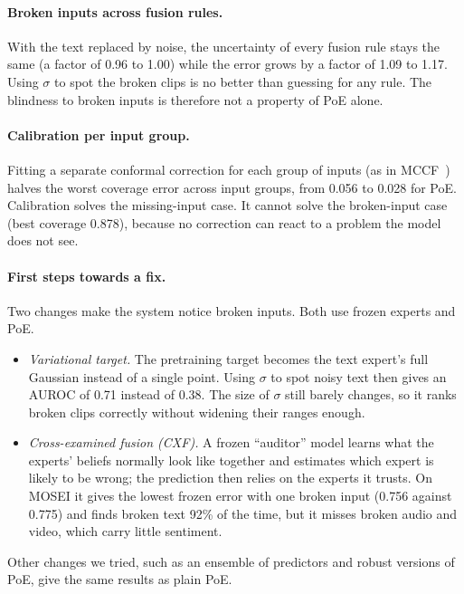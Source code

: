 \documentclass[10pt,twocolumn]{article}
\begin{document}
\paragraph{Broken inputs across fusion rules.} With the text replaced by noise, the uncertainty of every fusion rule
stays the same (a factor of 0.96 to 1.00) while the error grows by a factor of 1.09 to 1.17. Using $\sigma$ to spot the
broken clips is no better than guessing for any rule. The blindness to broken inputs is therefore not a property of PoE
alone.

\paragraph{Calibration per input group.} Fitting a separate conformal correction for each group of inputs (as in
MCCF~\cite{mccf2026}) halves the worst coverage error across input groups, from 0.056 to 0.028 for PoE. Calibration
solves the missing-input case. It cannot solve the broken-input case (best coverage 0.878), because no correction can
react to a problem the model does not see.

\paragraph{First steps towards a fix.} Two changes make the system notice broken inputs. Both use frozen experts and PoE.
\begin{itemize}
\item \emph{Variational target.} The pretraining target becomes the text expert's full Gaussian instead of a single
  point. Using $\sigma$ to spot noisy text then gives an AUROC of 0.71 instead of 0.38. The size of $\sigma$ still barely
  changes, so it ranks broken clips correctly without widening their ranges enough.
\item \emph{Cross-examined fusion (CXF).} A frozen ``auditor'' model learns what the experts' beliefs normally look like
  together and estimates which expert is likely to be wrong; the prediction then relies on the experts it trusts. On
  MOSEI it gives the lowest frozen error with one broken input (0.756 against 0.775) and finds broken text 92\% of the
  time, but it misses broken audio and video, which carry little sentiment.
\end{itemize}
Other changes we tried, such as an ensemble of predictors and robust versions of PoE, give the same results as plain PoE.
\end{document}
